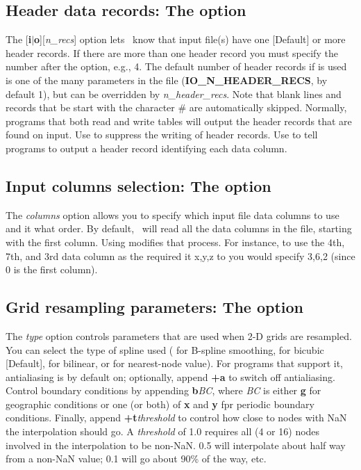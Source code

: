 \subsection{Header data records: The  option}
\label{sec:header}
The [\textbf{i}$|$\textbf{o}][\emph{n\_recs}] option lets \GMT\ know that input file(s) have
one [Default] or more header records.  If there are more than one header
record you must specify the number after the  option, e.g., 4.  The
default number of header records if  is used is one of the many parameters
in the  file (\textbf{IO\_N\_HEADER\_RECS}, by default 1),
but can be overridden by \emph{n\_header\_recs}.
Note that blank lines and records that be start with the character \# are
automatically skipped.  Normally, programs that both read and write tables will
output the header records that are found on input.  Use  to suppress the
writing of header records.  Use  to tell programs to output a header record
identifying each data column.

\subsection{Input columns selection: The  option}
\label{sec:incols}
The \emph{columns} option allows you to specify which
input file data columns to use and it what order.  By default, \GMT\ will
read all the data columns in the file, starting with the first column.
Using  modifies that process.  For instance, to use the 4th, 7th, and
3rd data column as the required {it x,y,z} to  you would
specify 3,6,2 (since 0 is the first column).

\subsection{Grid resampling parameters: The  option}
\label{sec:resample}
The \emph{type} option controls parameters that are
used when 2-D grids are resampled.  You can select the type
of spline used ( for B-spline smoothing,  for bicubic [Default],
 for bilinear, or  for nearest-node value).
For programs that support it, antialiasing is by default on;
optionally, append {\bf +a} to switch off antialiasing.
Control boundary conditions by appending {\bf b}{\it BC},
where {\it BC} is either {\bf g} for geographic conditions
or one (or both) of  {\bf x} and {\bf y} fpr periodic boundary
conditions.  Finally, append {\bf +t}{\it threshold} to control
how close to nodes with NaN the interpolation should go.  A
{\it threshold} of 1.0 requires all (4 or 16) nodes involved in the
interpolation to be non-NaN. 0.5 will interpolate about half way from a
non-NaN value; 0.1 will go about 90\% of the way, etc.

